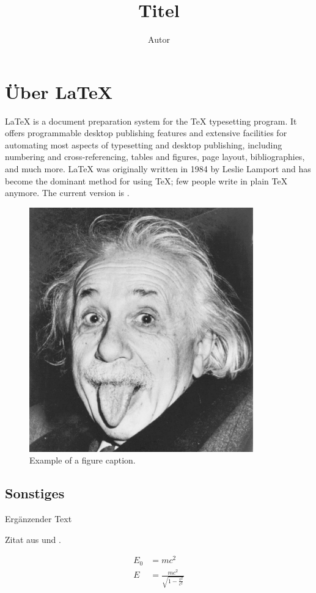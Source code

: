 \documentclass[a4paper, numbers=withenddot, 11pt]{scrartcl}
\title{{{Titel}}}
\author{{{Autor}}}
\begin{document}
\maketitle

\tableofcontents

\section{Über \LaTeX}

\LaTeX{} is a document preparation system for the \TeX{} typesetting program. It offers programmable desktop publishing features and extensive facilities for automating most aspects of typesetting and desktop publishing, including numbering and  cross-referencing, tables and figures, page layout, bibliographies, and much more. \LaTeX{} was originally written in 1984 by Leslie Lamport and has become the  dominant method for using \TeX; few people write in plain \TeX{} anymore. The current version is \LaTeXe.

\begin{figure}[htbp]
\centerline{\includegraphics[width=0.3\linewidth]{einstein}}
\caption{Example of a figure caption.}
\label{fig}
\end{figure}

\subsection{Sonstiges}

{{Ergänzender Text }}



Zitat aus \cite{scheme} und \cite[17]{knuth}.

\begin{align}
E_0 &= mc^2 \\
E &= \frac{mc^2}{\sqrt{1-\frac{v^2}{c^2}}}
\end{align}

\printbibliography
\end{document}
